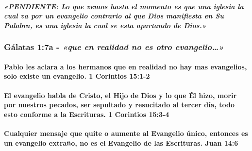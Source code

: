 \documentclass[11a pt,twoside]{article}
\newcommand{\scripture}[1]{%
  {\fontsize{12pt}{16pt}\selectfont\ScriptureFont\itshape #1}%
}
\def\textbf#1{#1}%
\let\oldsubsubsection\subsubsection
\renewcommand{\subsubsection}{\needspace{4\baselineskip}\oldsubsubsection}
\let\oldparagraph\paragraph
\renewcommand{\paragraph}{\needspace{3\baselineskip}\oldparagraph}
\begin{document}
\paragraph{\texorpdfstring{\scripture{«PENDIENTE: Lo que vemos hasta el momento es que una iglesia la cual va por un evangelio contrario al que Dios manifiesta en Su Palabra, es una iglesia la cual se esta apartando de Dios.»}}{}}\label{pendiente-lo-que-vemos-hasta-el-momento-es-que-una-iglesia-la-cual-va-por-un-evangelio-contrario-al-que-dios-manifiesta-en-su-palabra-es-una-iglesia-la-cual-se-esta-apartando-de-dios.}

\subsubsection{\texorpdfstring{Gálatas 1:7a -
\scripture{«que en realidad no es otro evangelio…»}}{Gálatas 1:7a - }}\label{guxe1latas-17a---que-en-realidad-no-es-otro-evangelio}

\paragraph{Pablo les aclara a los hermanos que en realidad no hay mas
evangelios, solo existe un evangelio. 1 Corintios
15:1-2}\label{pablo-les-aclara-a-los-hermanos-que-en-realidad-no-hay-mas-evangelios-solo-existe-un-evangelio.-1-corintios-151-2}

\paragraph{El evangelio habla de Cristo, el Hijo de Dios y lo que Él
hizo, morir por nuestros pecados, ser sepultado y resucitado al tercer
día, todo esto conforme a la Escrituras. 1 Corintios
15:3-4}\label{el-evangelio-habla-de-cristo-el-hijo-de-dios-y-lo-que-uxe9l-hizo-morir-por-nuestros-pecados-ser-sepultado-y-resucitado-al-tercer-duxeda-todo-esto-conforme-a-la-escrituras.-1-corintios-153-4}

\paragraph{\texorpdfstring{Cualquier mensaje que quite o aumente al
Evangelio único, entonces es un evangelio extraño, \textbf{no} es el
Evangelio de las Escrituras. Juan
14:6}{Cualquier mensaje que quite o aumente al Evangelio único, entonces es un evangelio extraño, no es el Evangelio de las Escrituras. Juan 14:6}}\label{cualquier-mensaje-que-quite-o-aumente-al-evangelio-uxfanico-entonces-es-un-evangelio-extrauxf1o-no-es-el-evangelio-de-las-escrituras.-juan-146}
\end{document}
